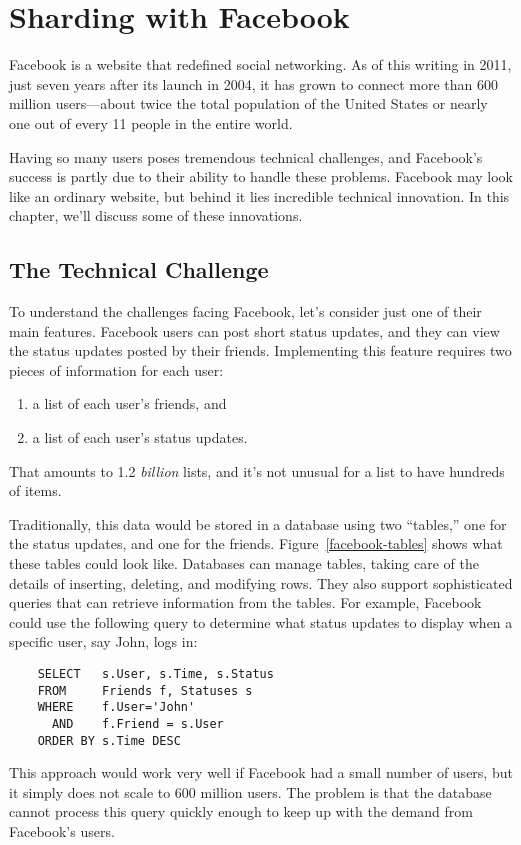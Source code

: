 \chapter{Sharding with Facebook}

Facebook is a website that redefined social networking.  As of this writing in 2011, just seven
years after its launch in 2004, it has grown to connect more than 600 million users---about twice
the total population of the United States or nearly one out of every 11 people in the entire world.

Having so many users poses tremendous technical challenges, and Facebook's success is partly due to
their ability to handle these problems.  Facebook may look like an ordinary website, but behind it
lies incredible technical innovation.  In this chapter, we'll discuss some of these innovations.

\section{The Technical Challenge}

To understand the challenges facing Facebook, let's consider just one of their main features.  Facebook
users can post short status updates, and they can view the status updates posted by their friends.
Implementing this feature requires two pieces of information for each user:
\begin{enumerate}
	\item a list of each user's friends, and
	\item a list of each user's status updates.
\end{enumerate}
That amounts to 1.2 \emph{billion} lists, and it's not unusual for a list to have hundreds of items.

Traditionally, this data would be stored in a database using two ``tables,'' one for the status updates,
and one for the friends.  Figure~\ref{facebook-tables} shows what these tables could look like.  Databases
can manage tables, taking care of the details of inserting, deleting, and modifying rows.  They also
support sophisticated queries that can retrieve information from the tables.  For example, Facebook could
use the following query to determine what status updates to display when a specific user, say John, logs in:
\begin{verbatim}
	SELECT   s.User, s.Time, s.Status
	FROM     Friends f, Statuses s
	WHERE    f.User='John'
	  AND    f.Friend = s.User
	ORDER BY s.Time DESC
\end{verbatim}
This approach would work very well if Facebook had a small number of users, but it simply does not scale to
600 million users.  The problem is that the database cannot process this query quickly enough to keep up with
the demand from Facebook's users.

